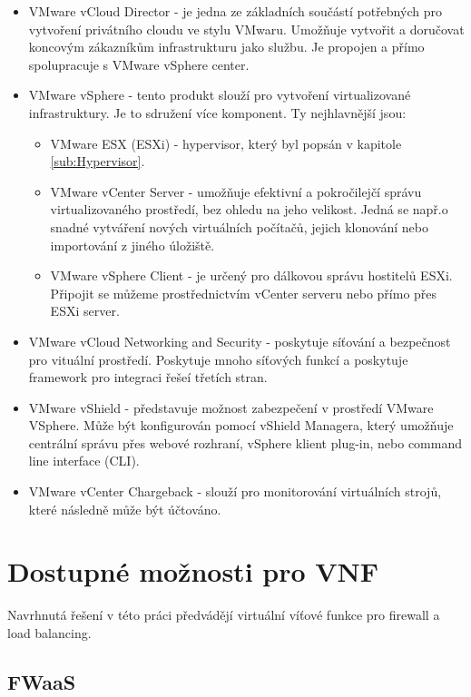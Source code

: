 \begin{itemize}
\item VMware vCloud Director - je  jedna  ze základních součástí potřebných pro vytvoření  privátního  cloudu ve stylu VMwaru.  Umožňuje vytvořit  a  doručovat  koncovým  zákazníkům infrastrukturu jako službu. Je propojen a přímo spolupracuje s VMware vSphere center.
\item VMware vSphere - tento produkt slouží pro vytvoření virtualizované infrastruktury. Je to sdružení více komponent. Ty nejhlavnější jsou:

\begin{itemize}
\item VMware ESX (ESXi) - hypervisor, který byl popsán v kapitole \ref{sub:Hypervisor}.
\item VMware vCenter Server - umožňuje efektivní a pokročilejčí správu virtualizovaného prostředí, bez ohledu na jeho velikost. Jedná se např.o snadné vytváření nových virtuálních počítačů, jejich  klonování  nebo  importování  z jiného  úložiště.  
\item VMware vSphere Client - je určený pro dálkovou správu hostitelů ESXi. Připojit se můžeme prostřednictvím vCenter serveru nebo přímo přes ESXi server.
\end{itemize} 
\item VMware vCloud Networking and Security - poskytuje síťování a bezpečnost pro vituální prostředí. Poskytuje mnoho síťových funkcí a poskytuje framework pro integraci řešeí třetích stran.
\item VMware vShield - představuje možnost zabezpečení v prostředí VMware VSphere. Může být konfigurován pomocí vShield Managera, který umožňuje centrální správu přes webové rozhraní, vSphere klient plug-in, nebo command line interface (CLI).
\item VMware vCenter Chargeback - slouží pro monitorování virtuálních strojů, které následně může být účtováno.
\end{itemize}


\section{Dostupné možnosti pro VNF}

Navrhnutá řešení v této práci předvádějí virtuální víťové funkce pro firewall a load balancing.

\subsection{FWaaS}

